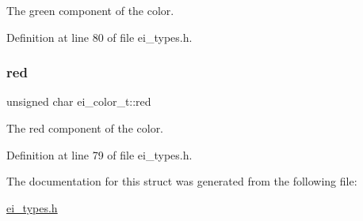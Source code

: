 The green component of the color. 



Definition at line 80 of file ei\+\_\+types.\+h.

\mbox{\label{structei__color__t_a9adf283c79176b3426ac63784f0bc17b}} 
\subsubsection{\texorpdfstring{red}{red}}
{\footnotesize\ttfamily unsigned char ei\+\_\+color\+\_\+t\+::red}



The red component of the color. 



Definition at line 79 of file ei\+\_\+types.\+h.



The documentation for this struct was generated from the following file\+:\begin{DoxyCompactItemize}
\item 
\hyperlink{ei__types_8h}{ei\+\_\+types.\+h}\end{DoxyCompactItemize}
